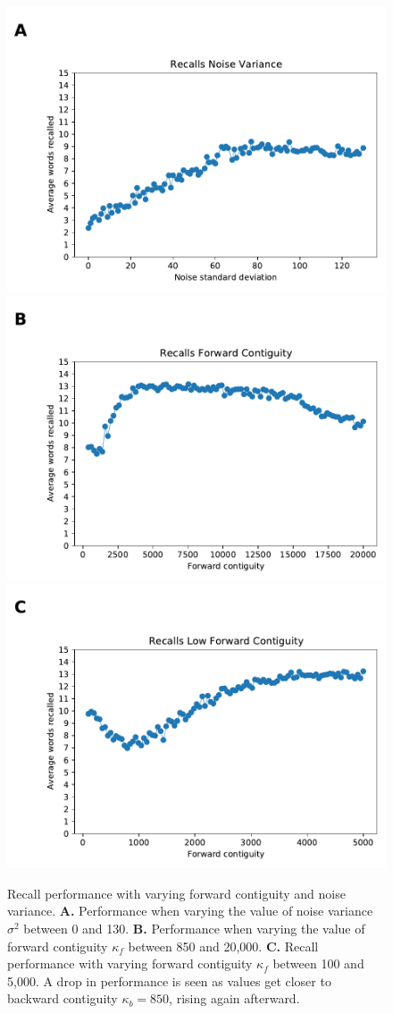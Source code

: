     \begin{figure}
        \centering
        \includegraphics[width=.68\textwidth]{graphics/noise_var.pdf}
        \includegraphics[width=.68\textwidth]{graphics/cont_forth.pdf}
        \includegraphics[width=.68\textwidth]{graphics/cont_forth_low.pdf}
        \caption{
        Recall performance with varying forward contiguity and noise variance.
        \textbf{A.} Performance when varying the value of noise variance \(\sigma^{2}\) between 0 and 130.
        \textbf{B.} Performance when varying the value of forward contiguity \(\kappa_{f}\) between 850 and 20,000.
        \textbf{C.} Recall performance with varying forward contiguity \(\kappa_{f}\) between 100 and 5,000.
        A drop in performance is seen as values get closer to backward contiguity \(\kappa_{b} = 850\), rising again afterward.
        }
        \label{fig:recall_performance_params}
    \end{figure}
    \clearpage
